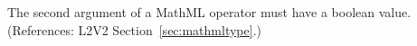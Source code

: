 The second argument of a MathML  operator must have
a boolean value.  (References: L2V2 Section~\ref{sec:mathmltype}.)
